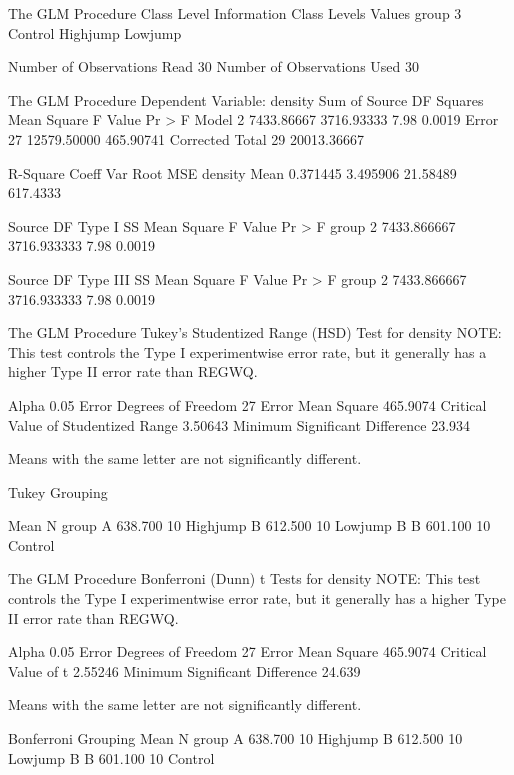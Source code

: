 \documentclass{article}
\begin{document}
\begin{Woutput}
The GLM Procedure
             Class Level Information
Class         Levels    Values
group              3    Control Highjump Lowjump

Number of Observations Read          30
Number of Observations Used          30

The GLM Procedure
Dependent Variable: density
                                        Sum of
Source                      DF         Squares     Mean Square    F Value    Pr > F
Model                        2      7433.86667      3716.93333       7.98    0.0019
Error                       27     12579.50000       465.90741
Corrected Total             29     20013.36667

R-Square     Coeff Var      Root MSE    density Mean
0.371445      3.495906      21.58489        617.4333

Source                      DF       Type I SS     Mean Square    F Value    Pr > F
group                        2     7433.866667     3716.933333       7.98    0.0019

Source                      DF     Type III SS     Mean Square    F Value    Pr > F
group                        2     7433.866667     3716.933333       7.98    0.0019

The GLM Procedure
Tukey's Studentized Range (HSD) Test for density
NOTE: This test controls the Type I experimentwise error rate, but it generally has a higher Type
II error rate than REGWQ.

Alpha                                   0.05
Error Degrees of Freedom                  27
Error Mean Square                   465.9074
Critical Value of Studentized Range  3.50643
Minimum Significant Difference        23.934

Means with the same letter are not significantly different.

Tukey
Grouping

           Mean      N    group
A       638.700     10    Highjump
B       612.500     10    Lowjump
B
B       601.100     10    Control

The GLM Procedure
Bonferroni (Dunn) t Tests for density
NOTE: This test controls the Type I experimentwise error rate, but it generally has a higher Type
II error rate than REGWQ.

Alpha                              0.05
Error Degrees of Freedom             27
Error Mean Square              465.9074
Critical Value of t             2.55246
Minimum Significant Difference   24.639

Means with the same letter are not significantly different.

Bonferroni
Grouping
           Mean      N    group
A       638.700     10    Highjump
B       612.500     10    Lowjump
B
B       601.100     10    Control
\end{Woutput}
\end{document}
